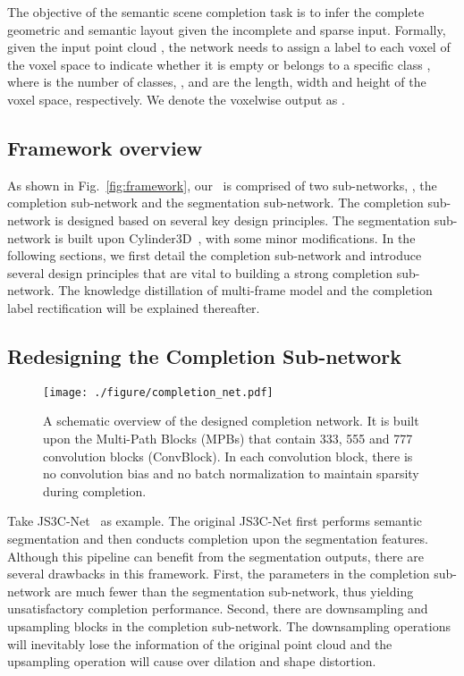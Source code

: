 \documentclass[10pt,twocolumn,letterpaper]{article}
\begin{document}
The objective of the semantic scene completion task is to infer the complete geometric and semantic layout given the incomplete and sparse input. Formally, given the input point cloud , the network needs to assign a label to each voxel of the  voxel space to indicate whether it is empty or belongs to a specific class , where  is the number of classes, ,  and  are the length, width and height of the voxel space, respectively. We denote the voxelwise output as .

\subsection{Framework overview}

As shown in Fig.~\ref{fig:framework}, our \algorithmname~is comprised of two sub-networks, \ie, the completion sub-network and the segmentation sub-network. The completion sub-network is designed based on several key design principles. The segmentation sub-network is built upon Cylinder3D~\cite{zhu2021cylindrical,zhu2021cylindrical-tpami}, with some minor modifications. In the following sections, we first detail the completion sub-network and introduce several design principles that are vital to building a strong completion sub-network. The knowledge distillation of multi-frame model and the completion label rectification will be explained thereafter.

\subsection{Redesigning the Completion Sub-network}

\begin{figure}[!ht]
 \centering
 \texttt{[image: ./figure/completion\_net.pdf]}
 \vskip -0.2cm
 \caption{A schematic overview of the designed completion network. It is built upon the Multi-Path Blocks (MPBs) that contain 333, 555 and 777 convolution blocks (ConvBlock). In each convolution block, there is no convolution bias and no batch normalization to maintain sparsity during completion.}
 \centering
 \vskip -0.2cm
 \label{fig:network}
\end{figure}


Take JS3C-Net~\cite{js3cnet} as example. The original JS3C-Net first performs semantic segmentation and then conducts completion upon the segmentation features. Although this pipeline can benefit from the segmentation outputs, there are several drawbacks in this framework. First, the parameters in the completion sub-network are much fewer than the segmentation sub-network, thus yielding unsatisfactory completion performance. Second, there are downsampling and upsampling blocks in the completion sub-network. The downsampling operations will inevitably lose the information of the original point cloud and the upsampling operation will cause over dilation and shape distortion. 
\end{document}
